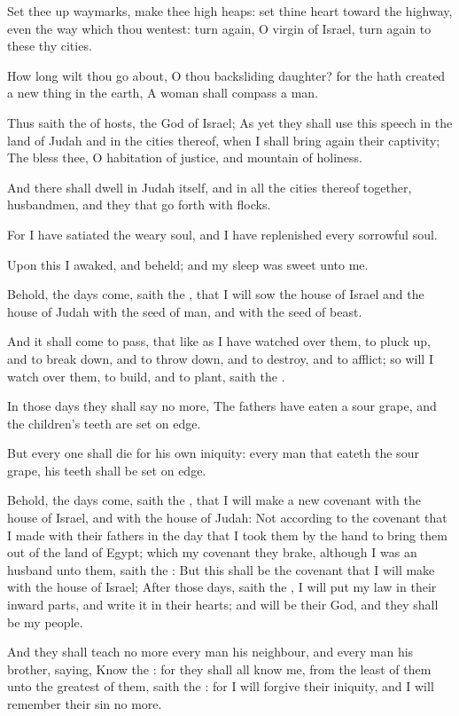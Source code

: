 \verse Set thee up waymarks, make thee high heaps: set thine heart toward the highway, even the way which thou wentest: turn again, O virgin of Israel, turn again to these thy cities.

\verse How long wilt thou go about, O thou backsliding daughter? for the \LORD hath created a new thing in the earth, A woman shall compass a man.

\verse Thus saith the \LORD of hosts, the God of Israel; As yet they shall use this speech in the land of Judah and in the cities thereof, when I shall bring again their captivity; The \LORD bless thee, O habitation of justice, and mountain of holiness.

\verse And there shall dwell in Judah itself, and in all the cities thereof together, husbandmen, and they that go forth with flocks.

\verse For I have satiated the weary soul, and I have replenished every sorrowful soul.

\verse Upon this I awaked, and beheld; and my sleep was sweet unto me.

\verse Behold, the days come, saith the \LORD, that I will sow the house of Israel and the house of Judah with the seed of man, and with the seed of beast.

\verse And it shall come to pass, that like as I have watched over them, to pluck up, and to break down, and to throw down, and to destroy, and to afflict; so will I watch over them, to build, and to plant, saith the \LORD.

\verse In those days they shall say no more, The fathers have eaten a sour grape, and the children's teeth are set on edge.

\verse But every one shall die for his own iniquity: every man that eateth the sour grape, his teeth shall be set on edge.

\verse Behold, the days come, saith the \LORD, that I will make a new covenant with the house of Israel, and with the house of Judah: \verse Not according to the covenant that I made with their fathers in the day that I took them by the hand to bring them out of the land of Egypt; which my covenant they brake, although I was an husband unto them, saith the \LORD: \verse But this shall be the covenant that I will make with the house of Israel; After those days, saith the \LORD, I will put my law in their inward parts, and write it in their hearts; and will be their God, and they shall be my people.

\verse And they shall teach no more every man his neighbour, and every man his brother, saying, Know the \LORD: for they shall all know me, from the least of them unto the greatest of them, saith the \LORD: for I will forgive their iniquity, and I will remember their sin no more.

